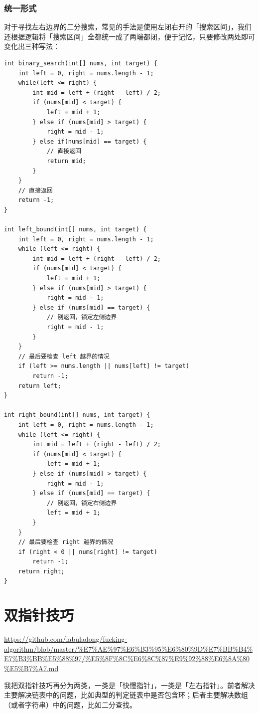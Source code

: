 \documentclass[12pt]{article}
\begin{document}
\subsubsection{统一形式}
对于寻找左右边界的二分搜索，常见的手法是使用左闭右开的「搜索区间」，我们还根据逻辑将「搜索区间」全都统一成了两端都闭，便于记忆，只要修改两处即可变化出三种写法：
\begin{lstlisting}
int binary_search(int[] nums, int target) {
    int left = 0, right = nums.length - 1; 
    while(left <= right) {
        int mid = left + (right - left) / 2;
        if (nums[mid] < target) {
            left = mid + 1;
        } else if (nums[mid] > target) {
            right = mid - 1; 
        } else if(nums[mid] == target) {
            // 直接返回
            return mid;
        }
    }
    // 直接返回
    return -1;
}

int left_bound(int[] nums, int target) {
    int left = 0, right = nums.length - 1;
    while (left <= right) {
        int mid = left + (right - left) / 2;
        if (nums[mid] < target) {
            left = mid + 1;
        } else if (nums[mid] > target) {
            right = mid - 1;
        } else if (nums[mid] == target) {
            // 别返回，锁定左侧边界
            right = mid - 1;
        }
    }
    // 最后要检查 left 越界的情况
    if (left >= nums.length || nums[left] != target)
        return -1;
    return left;
}

int right_bound(int[] nums, int target) {
    int left = 0, right = nums.length - 1;
    while (left <= right) {
        int mid = left + (right - left) / 2;
        if (nums[mid] < target) {
            left = mid + 1;
        } else if (nums[mid] > target) {
            right = mid - 1;
        } else if (nums[mid] == target) {
            // 别返回，锁定右侧边界
            left = mid + 1;
        }
    }
    // 最后要检查 right 越界的情况
    if (right < 0 || nums[right] != target)
        return -1;
    return right;
}
\end{lstlisting}

\section{双指针技巧}
\url{https://github.com/labuladong/fucking-algorithm/blob/master/%E7%AE%97%E6%B3%95%E6%80%9D%E7%BB%B4%E7%B3%BB%E5%88%97/%E5%8F%8C%E6%8C%87%E9%92%88%E6%8A%80%E5%B7%A7.md}

我把双指针技巧再分为两类，一类是「快慢指针」，一类是「左右指针」。前者解决主要解决链表中的问题，比如典型的判定链表中是否包含环；后者主要解决数组（或者字符串）中的问题，比如二分查找。
\end{document}
